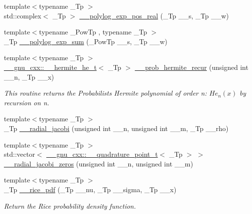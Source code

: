\begin{DoxyCompactItemize}
\item 
{\footnotesize template$<$typename \+\_\+\+Tp $>$ }\\std\+::complex$<$ \+\_\+\+Tp $>$ \hyperlink{namespacestd_1_1____detail_a8a6390a3855283fc27a5d57dd736b62e}{\+\_\+\+\_\+polylog\+\_\+exp\+\_\+pos\+\_\+real} (\+\_\+\+Tp \+\_\+\+\_\+s, \+\_\+\+Tp \+\_\+\+\_\+w)
\item 
{\footnotesize template$<$typename \+\_\+\+Pow\+Tp , typename \+\_\+\+Tp $>$ }\\\+\_\+\+Tp \hyperlink{namespacestd_1_1____detail_acbdb1ad0debb8c919b4dcb1589af734c}{\+\_\+\+\_\+polylog\+\_\+exp\+\_\+sum} (\+\_\+\+Pow\+Tp \+\_\+\+\_\+s, \+\_\+\+Tp \+\_\+\+\_\+w)
\item 
{\footnotesize template$<$typename \+\_\+\+Tp $>$ }\\\hyperlink{struct____gnu__cxx_1_1____hermite__he__t}{\+\_\+\+\_\+gnu\+\_\+cxx\+::\+\_\+\+\_\+hermite\+\_\+he\+\_\+t}$<$ \+\_\+\+Tp $>$ \hyperlink{namespacestd_1_1____detail_a15e668e86c18d01134aded2a1657b1b2}{\+\_\+\+\_\+prob\+\_\+hermite\+\_\+recur} (unsigned int \+\_\+\+\_\+n, \+\_\+\+Tp \+\_\+\+\_\+x)
\begin{DoxyCompactList}\small\item\em This routine returns the Probabilists Hermite polynomial of order n\+: $ He_n(x) $ by recursion on n. \end{DoxyCompactList}\item 
{\footnotesize template$<$typename \+\_\+\+Tp $>$ }\\\+\_\+\+Tp \hyperlink{namespacestd_1_1____detail_a6d85c9848b491999fc80a1cdbd23db66}{\+\_\+\+\_\+radial\+\_\+jacobi} (unsigned int \+\_\+\+\_\+n, unsigned int \+\_\+\+\_\+m, \+\_\+\+Tp \+\_\+\+\_\+rho)
\item 
{\footnotesize template$<$typename \+\_\+\+Tp $>$ }\\std\+::vector$<$ \hyperlink{struct____gnu__cxx_1_1____quadrature__point__t}{\+\_\+\+\_\+gnu\+\_\+cxx\+::\+\_\+\+\_\+quadrature\+\_\+point\+\_\+t}$<$ \+\_\+\+Tp $>$ $>$ \hyperlink{namespacestd_1_1____detail_a805abfff8b2898e15c507f679c0e15f3}{\+\_\+\+\_\+radial\+\_\+jacobi\+\_\+zeros} (unsigned int \+\_\+\+\_\+n, unsigned int \+\_\+\+\_\+m)
\item 
{\footnotesize template$<$typename \+\_\+\+Tp $>$ }\\\+\_\+\+Tp \hyperlink{namespacestd_1_1____detail_a571f37fdf793a91985073a58a873e731}{\+\_\+\+\_\+rice\+\_\+pdf} (\+\_\+\+Tp \+\_\+\+\_\+nu, \+\_\+\+Tp \+\_\+\+\_\+sigma, \+\_\+\+Tp \+\_\+\+\_\+x)
\begin{DoxyCompactList}\small\item\em Return the Rice probability density function. \end{DoxyCompactList}\item 

\end{DoxyCompactItemize}
